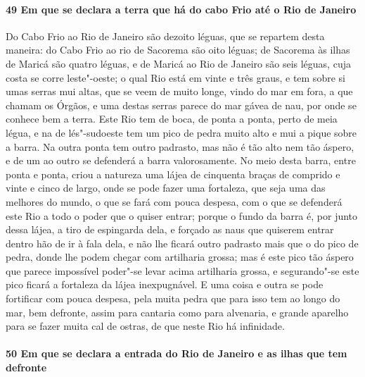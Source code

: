 \paragraph{49 Em que se declara a terra que há do cabo Frio até o Rio de Janeiro}

Do Cabo Frio ao Rio de Janeiro são dezoito léguas, que se repartem desta maneira: do Cabo
Frio ao rio de Sacorema são oito léguas; de Sacorema às ilhas de Maricá são quatro léguas,
e de Maricá ao Rio de Janeiro são seis léguas, cuja costa se corre leste"-oeste; o qual Rio
está em vinte e três graus, e tem sobre si umas serras mui altas, que se veem de muito
longe, vindo do mar em fora, a que chamam os Órgãos, e uma destas serras parece do mar
gávea de nau, por onde se conhece bem a terra. Este Rio tem de boca, de ponta a ponta,
perto de meia légua, e na de lés"-sudoeste tem um pico de pedra muito alto e mui a pique
sobre a barra. Na outra ponta tem outro padrasto, mas não é tão alto nem tão áspero, e de
um ao outro se defenderá a barra valorosamente. No meio desta barra, entre ponta e ponta,
criou a natureza uma lájea de cinquenta braças de comprido e vinte e cinco de largo, onde
se pode fazer uma fortaleza, que seja uma das melhores do mundo, o que se fará com pouca
despesa, com o que se defenderá este Rio a todo o poder que o quiser entrar; porque o
fundo da barra é, por junto dessa lájea, a tiro de espingarda dela, e forçado as naus que
quiserem entrar dentro hão de ir à fala dela, e não lhe ficará outro padrasto mais que o
do pico de pedra, donde lhe podem chegar com artilharia grossa; mas é este pico tão áspero
que parece impossível poder"-se levar acima artilharia grossa, e segurando"-se este pico
ficará a fortaleza da lájea inexpugnável. E uma coisa e outra se pode fortificar com pouca
despesa, pela muita pedra que para isso tem ao longo do mar, bem defronte, assim para
cantaria como para alvenaria, e grande aparelho para se fazer muita cal de ostras, de que
neste Rio há infinidade.

\paragraph{50 Em que se declara a entrada do Rio de Janeiro e as ilhas que tem defronte}

